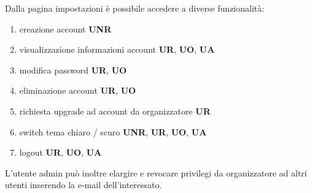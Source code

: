 \documentclass{article}
\begin{document}
\begin{description}
\begin{center}
        \end{center}
    \item[] Dalla pagina impostazioni è possibile accedere a diverse funzionalità:
        \begin{enumerate}
            \item creazione account \textbf{UNR}
            \item visualizzazione informazioni account \textbf{UR}, \textbf{UO}, \textbf{UA}
            \item modifica password \textbf{UR}, \textbf{UO}
            \item eliminazione account \textbf{UR}, \textbf{UO}
            \item richiesta upgrade ad account da organizzatore \textbf{UR}
            \item switch tema chiaro / scuro \textbf{UNR}, \textbf{UR}, \textbf{UO}, \textbf{UA}
            \item logout \textbf{UR}, \textbf{UO}, \textbf{UA}
        \end{enumerate}
    \item[] L'utente admin può inoltre elargire e revocare privilegi da organizzatore ad altri utenti inserendo la e-mail dell'interessato.
\end{description}
\end{document}
